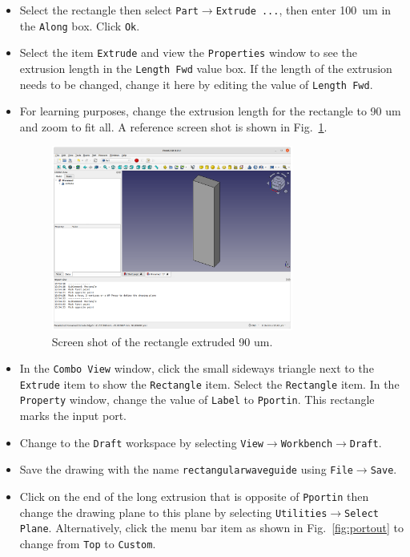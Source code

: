 \documentclass[titlepage]{article}
\renewcommand\_{\textunderscore\linebreak[1]}
\begin{document}
\begin{itemize}
\item Select the rectangle then select \texttt{Part}$\rightarrow$\texttt{Extrude ...}, then enter 100~um in the \texttt{Along} box.  Click \texttt{Ok}.
\item Select the item \texttt{Extrude} and view the \texttt{Properties} window to see the extrusion length in the \texttt{Length Fwd} value box.  If the length of the extrusion needs to be changed, change it here by editing the value of \texttt{Length Fwd}.
\item For learning purposes, change the extrusion length for the rectangle to 90 um and zoom to fit all.  A reference screen shot is shown in Fig.~\ref{fig:extrusion}.
\begin{figure}
  \centering
  \includegraphics[width=0.75\textwidth]{../tutorials/OpenParEM3D/rectangular_waveguide/screenshots/extrusion}
  \caption{Screen shot of the rectangle extruded 90 um.}
  \label{fig:extrusion}
\end{figure}
\item In the \texttt{Combo View} window, click the small sideways triangle next to the \texttt{Extrude} item to show the \texttt{Rectangle} item.  Select the \texttt{Rectangle} item.  In the \texttt{Property} window, change the value of \texttt{Label} to \newline \texttt{\_Pportin}.  This rectangle marks the input port.
\item Change to the \texttt{Draft} workspace by selecting \texttt{View}$\rightarrow$\texttt{Workbench}$\rightarrow$\texttt{Draft}.
\item Save the drawing with the name \texttt{rectangular\_waveguide} using \texttt{File}$\rightarrow$\texttt{Save}.
\item Click on the end of the long extrusion that is opposite of \texttt{\_Pportin} then change the drawing plane to this plane by selecting \texttt{Utilities}$\rightarrow$\texttt{Select Plane}.  Alternatively, click the menu bar item as shown in Fig.~\ref{fig:portout} to change from \texttt{Top} to \texttt{Custom}.

\end{itemize}
\end{document}
